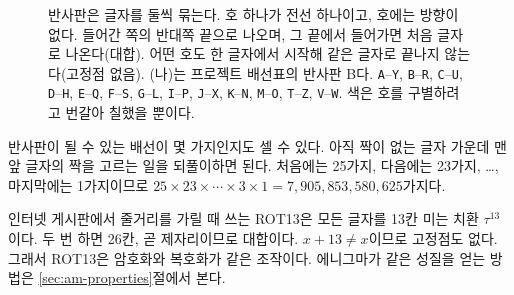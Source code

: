 \begin{figure}[ht]
\centering
{}

\medskip
{}
\caption{반사판은 글자를 둘씩 묶는다. 호 하나가 전선 하나이고, 호에는 방향이 없다. 들어간 쪽의 반대쪽 끝으로
나오며, 그 끝에서 들어가면 처음 글자로 나온다(대합). 어떤 호도 한 글자에서 시작해 같은 글자로 끝나지 않는다(고정점
없음). (나)는 프로젝트 배선표의 반사판 B다. \texttt{A}--\texttt{Y}, \texttt{B}--\texttt{R}, \texttt{C}--\texttt{U},
\texttt{D}--\texttt{H}, \texttt{E}--\texttt{Q}, \texttt{F}--\texttt{S}, \texttt{G}--\texttt{L}, \texttt{I}--\texttt{P},
\texttt{J}--\texttt{X}, \texttt{K}--\texttt{N}, \texttt{M}--\texttt{O}, \texttt{T}--\texttt{Z}, \texttt{V}--\texttt{W}.
색은 호를 구별하려고 번갈아 칠했을 뿐이다.}
\label{fig:am-reflector}
\end{figure}

반사판이 될 수 있는 배선이 몇 가지인지도 셀 수 있다. 아직 짝이 없는 글자 가운데 맨 앞 글자의 짝을 고르는 일을
되풀이하면 된다. 처음에는 25가지, 다음에는 23가지, \ldots, 마지막에는 1가지이므로
$25 \times 23 \times \cdots \times 3 \times 1 = 7{,}905{,}853{,}580{,}625$가지다.

\General 인터넷 게시판에서 줄거리를 가릴 때 쓰는 ROT13은 모든 글자를 13칸 미는 치환 $\tau^{13}$이다. 두 번 하면
26칸, 곧 제자리이므로 대합이다. $x + 13 \neq x$이므로 고정점도 없다. 그래서 ROT13은 암호화와 복호화가 같은
조작이다. 에니그마가 같은 성질을 얻는 방법은 \ref{sec:am-properties}절에서 본다.

